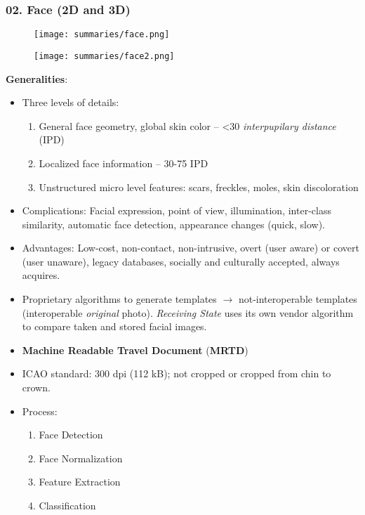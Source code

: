 \documentclass[a4paper]{article}
\begin{document}
    \subsubsection*{02. Face (2D and 3D)}
      \begin{figure}[htp]
        \centering
          \texttt{[image: summaries/face.png]}
      \end{figure}
      \begin{figure}[htp]
        \centering
          \texttt{[image: summaries/face2.png]}
      \end{figure}
      \textbf{Generalities}:
      \begin{itemize}
        \item Three levels of details:
        \begin{enumerate}
          \item General face geometry, global skin color -- <30 \emph{interpupilary distance} (IPD)
          \item Localized face information -- 30-75 IPD
          \item Unstructured micro level features: scars, freckles, moles, skin discoloration
        \end{enumerate}
        \item Complications: Facial expression, point of view, illumination, inter-class similarity, automatic face detection, appearance changes (quick, slow).
        \item Advantages: Low-cost, non-contact, non-intrusive, overt (user aware) or covert (user unaware), legacy databases, socially and culturally accepted, always acquires.
        \item Proprietary algorithms to generate templates $\rightarrow$ not-interoperable templates (interoperable \emph{original} photo). \emph{Receiving State} uses its own vendor algorithm to compare taken and stored facial images.
        \item \textbf{Machine Readable Travel Document} (\textbf{MRTD})
        \item ICAO standard: 300 dpi (112 kB); not cropped or cropped from chin to crown.
        \item Process:
        \begin{enumerate}
          \item Face Detection
          \item Face Normalization
          \item Feature Extraction
          \item Classification
        \end{enumerate}
      \end{itemize}
\end{document}
